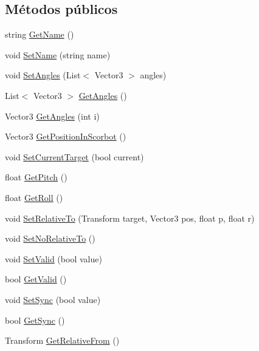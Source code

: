 \subsection*{Métodos públicos}
\begin{DoxyCompactItemize}
\item 
string \mbox{\hyperlink{class_target_model_a3f08aa61678b55ad41acc59c9d4f4f9c}{Get\+Name}} ()
\item 
void \mbox{\hyperlink{class_target_model_a056e89cd27d78b4d7d024d8bc4d0d3cd}{Set\+Name}} (string name)
\item 
void \mbox{\hyperlink{class_target_model_a36babf52c1f4e545e7db883cb66fbce5}{Set\+Angles}} (List$<$ Vector3 $>$ angles)
\item 
List$<$ Vector3 $>$ \mbox{\hyperlink{class_target_model_a6e50c4236edc8efc587238ccfdf90c7e}{Get\+Angles}} ()
\item 
Vector3 \mbox{\hyperlink{class_target_model_a8234e7f5a9811ba3b72ec74de2a38926}{Get\+Angles}} (int i)
\item 
Vector3 \mbox{\hyperlink{class_target_model_a17e1641d07e21286f6699f4b2b39fef5}{Get\+Position\+In\+Scorbot}} ()
\item 
void \mbox{\hyperlink{class_target_model_a1f82c9cde211b28154e072c7873994d9}{Set\+Current\+Target}} (bool current)
\item 
float \mbox{\hyperlink{class_target_model_a5b6b7410ef505df9da09279ab341eceb}{Get\+Pitch}} ()
\item 
float \mbox{\hyperlink{class_target_model_a8cd198c6d6a066183432127e2dc68390}{Get\+Roll}} ()
\item 
void \mbox{\hyperlink{class_target_model_ad3bc453cd76840108e7b7ffdd783c175}{Set\+Relative\+To}} (Transform target, Vector3 pos, float p, float r)
\item 
void \mbox{\hyperlink{class_target_model_a6f7401c43a6ba1c0f7204dcf66efbed5}{Set\+No\+Relative\+To}} ()
\item 
void \mbox{\hyperlink{class_target_model_a2e4a1b3d4b27c14c3d2c7657af636b0f}{Set\+Valid}} (bool value)
\item 
bool \mbox{\hyperlink{class_target_model_a9bb012f5488eb24605440467601f3dfc}{Get\+Valid}} ()
\item 
void \mbox{\hyperlink{class_target_model_ab048bc78c22041dd77489f34d4cecf69}{Set\+Sync}} (bool value)
\item 
bool \mbox{\hyperlink{class_target_model_a6cb8e2993f269328e380670f9b545b80}{Get\+Sync}} ()
\item 
Transform \mbox{\hyperlink{class_target_model_a12dc805fa302de9151fac2f8ce959b19}{Get\+Relative\+From}} ()

\end{DoxyCompactItemize}

